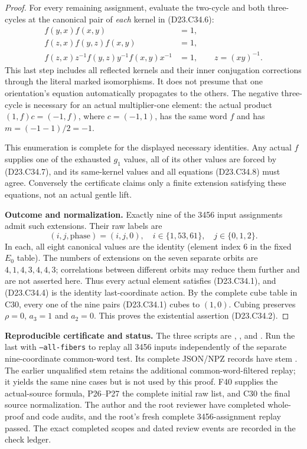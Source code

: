 \begin{proof}
For every remaining assignment, evaluate the
two-cycle and both three-cycles at the canonical
pair of \emph{each} kernel in (D23.C34.6):
\[
\begin{split}
 f(y,x)f(x,y)&=1,\\
 f(z,x)f(y,z)f(x,y)&=1,\\
 f(z,x)z^{-1}f(y,z)y^{-1}f(x,y)x^{-1}&=1,
                \qquad z=(xy)^{-1}.
\end{split}                                               \tag{D23.C34.8}
\]
This last step includes all reflected kernels and
their inner conjugation corrections through the
literal marked isomorphisms.  It does not presume
that one orientation's equation automatically
propagates to the others.
The negative three-cycle is necessary for an
actual multiplier-one element: the actual product
$(1,f)c=(-1,f)$, where $c=(-1,1)$, has the same
word $f$ and has $m=(-1-1)/2=-1$.

This enumeration is complete for the displayed
necessary identities.  Any actual $f$ supplies
one of the exhausted $g_1$ values, all of its other
values are forced by (D23.C34.7), and its same-kernel
values and all equations (D23.C34.8) must agree.
Conversely the certificate claims only a finite
extension satisfying these equations, not an
actual gentle lift.

\textbf{Outcome and normalization.}\quad
Exactly nine of the 3456 input assignments admit
such extensions.  Their raw labels are
\[
                 (i,j,\text{phase})=(i,j,0),
           \quad i\in\{1,53,61\},\quad j\in\{0,1,2\}.
\]
In each, all eight canonical values are the
identity (element index 6 in the fixed $E_0$ table).
The numbers of extensions on the seven separate
orbits are $4,1,4,3,4,4,3$; correlations between
different orbits may reduce them further and are
not asserted here.
Thus every actual element satisfies
(D23.C34.1), and (D23.C34.4) is the identity
last-coordinate action.
By the complete cube table in C30, every one
of the nine pairs (D23.C34.1) cubes to $(1,0)$.
Cubing preserves $\rho=0$, $a_3=1$ and $a_2=0$.
This proves the existential assertion (D23.C34.2).
\end{proof}

\textbf{Reproducible certificate and status.}\quad
The three scripts are
,
,
and
.
Run the last with \texttt{--all-fibers} to replay all
3456 inputs independently of the separate nine-coordinate
common-word test.  Its complete JSON/NPZ records have
stem
.
The earlier unqualified stem retains the additional
common-word-filtered replay; it yields the same nine
cases but is not used by this proof.
F40 supplies the actual-source formula, P26--P27 the
complete initial raw list, and C30 the final source
normalization.  The author and the root reviewer have
completed whole-proof and code audits, and the root's
fresh complete 3456-assignment replay passed.
The exact completed scopes and dated review events
are recorded in the check ledger.
